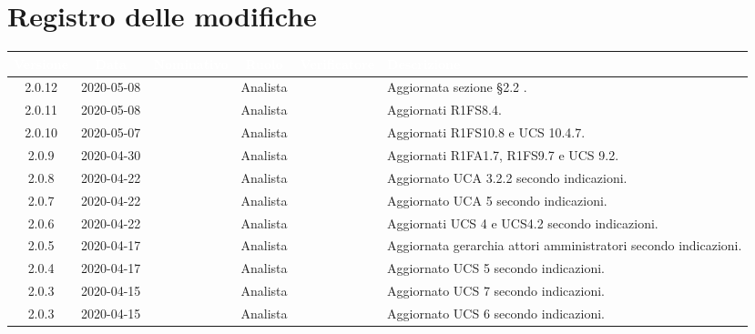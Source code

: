 \section*{Registro delle modifiche}
\setcounter{table}{-1}
{

\renewcommand{\arraystretch}{1.5}
\centering
\begin{longtable}{ c c  C{2.3cm} c C{3cm} C{3.2cm}}
\textcolor{white}{\textbf{Versione}} &
\textcolor{white}{\textbf{Data}}&
\textcolor{white}{\textbf{Nominativo}}&
\textcolor{white}{\textbf{Ruolo}}&
\textcolor{white}{\textbf{Verificatore}}&
\textcolor{white}{\textbf{Descrizione}}\\
\endhead

2.0.12 & 2020-05-08 & \DF{} & Analista & \AT{} & Aggiornata sezione §2.2 .\\

2.0.11 & 2020-05-08 & \AT{} & Analista & \DF{} & Aggiornati R1FS8.4. \\

2.0.10 & 2020-05-07 & \DF{} & Analista & \AT{} & Aggiornati R1FS10.8 e UCS 10.4.7. \\

2.0.9 & 2020-04-30 & \DF{} & Analista & \AT{} & Aggiornati R1FA1.7, R1FS9.7 e UCS 9.2. \\

2.0.8 & 2020-04-22 & \AT{} & Analista & \DF{} & Aggiornato UCA 3.2.2 secondo indicazioni. \\

2.0.7 & 2020-04-22 & \AT{} & Analista & \DF{} & Aggiornato UCA 5 secondo indicazioni. \\

2.0.6 & 2020-04-22 & \AT{} & Analista & \DF{} & Aggiornati UCS 4 e UCS4.2 secondo indicazioni. \\

2.0.5 & 2020-04-17 & \AT{} & Analista & \DF{} & Aggiornata gerarchia attori amministratori secondo indicazioni. \\

2.0.4 & 2020-04-17 & \DF{} & Analista & \AT{} & Aggiornato UCS 5 secondo indicazioni. \\

2.0.3 & 2020-04-15 & \DF{} & Analista & \AT{} & Aggiornato UCS 7 secondo indicazioni. \\

2.0.3 & 2020-04-15 & \DF{} & Analista & \AT{} & Aggiornato UCS 6 secondo indicazioni. \\


\end{longtable}}
